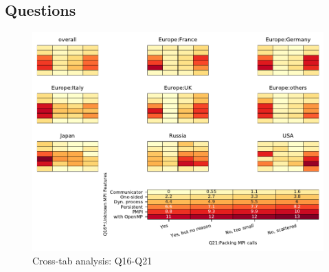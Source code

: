 
\subsection{Questions}


\begin{figure}
\begin{center}
\includegraphics[width=12cm]{../pdfs/Q16-Q21.pdf}
\caption{Cross-tab analysis: Q16-Q21}
\label{fig:Q16-Q21}
\end{center}
\end{figure}
